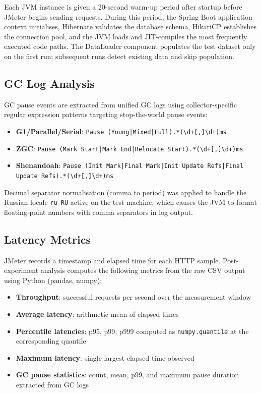 Each JVM instance is given a 20-second warm-up period after startup before JMeter begins sending requests. During this period, the Spring Boot application context initialises, Hibernate validates the database schema, HikariCP establishes the connection pool, and the JVM loads and JIT-compiles the most frequently executed code paths. The DataLoader component populates the test dataset only on the first run; subsequent runs detect existing data and skip population.

\subsection{GC Log Analysis}
\label{subsec:gc-analysis}

GC pause events are extracted from unified GC logs using collector-specific regular expression patterns targeting stop-the-world pause events:

\begin{itemize}
    \item \textbf{G1/Parallel/Serial}: \texttt{Pause (Young|Mixed|Full).*(\textbackslash d+[,\.]\textbackslash d+)ms}
    \item \textbf{ZGC}: \texttt{Pause (Mark Start|Mark End|Relocate Start).*(\textbackslash d+[,\.]\textbackslash d+)ms}
    \item \textbf{Shenandoah}: \texttt{Pause (Init Mark|Final Mark|Init Update Refs|Final Update Refs).*(\textbackslash d+[,\.]\textbackslash d+)ms}
\end{itemize}

Decimal separator normalisation (comma to period) was applied to handle the Russian locale \texttt{ru\_RU} active on the test machine, which causes the JVM to format floating-point numbers with comma separators in log output.

\subsection{Latency Metrics}
\label{subsec:metrics}

JMeter records a timestamp and elapsed time for each HTTP sample. Post-experiment analysis computes the following metrics from the raw CSV output using Python (pandas, numpy):

\begin{itemize}
    \item \textbf{Throughput}: successful requests per second over the measurement window
    \item \textbf{Average latency}: arithmetic mean of elapsed times
    \item \textbf{Percentile latencies}: p95, p99, p999 computed as \texttt{numpy.quantile} at the corresponding quantile
    \item \textbf{Maximum latency}: single largest elapsed time observed
    \item \textbf{GC pause statistics}: count, mean, p99, and maximum pause duration extracted from GC logs
\end{itemize}

